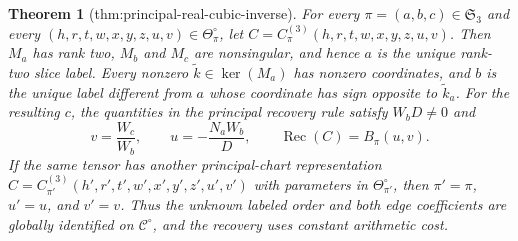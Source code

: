 \documentclass{article}
\newtheorem{theorem}{Theorem}
\begin{document}
\begin{theorem}[thm:principal-real-cubic-inverse]\label{thm:principal-real-cubic-inverse}
For every \(\pi=(a,b,c)\in\mathfrak S_3\) and every \((h,r,t,w,x,y,z,u,v)\in\Theta_{\pi}^{\circ}\), let
\(C=C_{\pi}^{(3)}(h,r,t,w,x,y,z,u,v)\).  Then \(M_a\) has rank two, \(M_b\) and \(M_c\) are nonsingular, and hence \(a\) is the unique rank-two slice label.  Every nonzero \(\widetilde k\in\ker(M_a)\) has nonzero coordinates, and \(b\) is the unique label different from \(a\) whose coordinate has sign opposite to \(\widetilde k_a\).  For the resulting \(c\), the quantities in the principal recovery rule satisfy \(W_bD\ne0\) and
\[
v=\frac{W_c}{W_b},
\qquad
u=-\frac{N_aW_b}{D},
\qquad
\operatorname{Rec}(C)=B_{\pi}(u,v).
\]
If the same tensor has another principal-chart representation
\(C=C_{\pi'}^{(3)}(h',r',t',w',x',y',z',u',v')\) with parameters in \(\Theta_{\pi'}^{\circ}\), then \(\pi'=\pi\), \(u'=u\), and \(v'=v\).  Thus the unknown labeled order and both edge coefficients are globally identified on \(\mathcal C^{\circ}\), and the recovery uses constant arithmetic cost.
\end{theorem}
\end{document}
